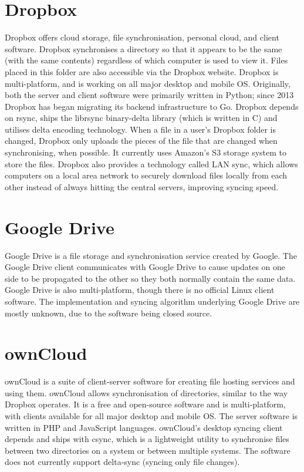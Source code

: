 \section{Dropbox}
  Dropbox offers cloud storage, file synchronisation, personal cloud, and client software. Dropbox synchronises a directory so that it appears to be the same (with the same contents) regardless of which computer is used to view it. Files placed in this folder are also accessible via the Dropbox website. Dropbox is multi-platform, and is working on all major desktop and mobile OS. Originally, both the server and client software were primarily written in Python; since 2013 Dropbox has began migrating its backend infrastructure to Go. Dropbox depends on rsync, ships the librsync binary-delta library (which is written in C) and utilises delta encoding technology. When a file in a user's Dropbox folder is changed, Dropbox only uploads the pieces of the file that are changed when synchronising, when possible. It currently uses Amazon's S3 storage system to store the files. Dropbox also provides a technology called LAN sync, which allows computers on a local area network to securely download files locally from each other instead of always hitting the central servers, improving syncing speed.

\section{Google Drive}
  Google Drive is a file storage and synchronisation service created by Google. The Google Drive client communicates with Google Drive to cause updates on one side to be propagated to the other so they both normally contain the same data. Google Drive is also multi-platform, though there is no official Linux client software. The implementation and syncing algorithm underlying Google Drive are mostly unknown, due to the software being closed source.

\section{ownCloud}
  \label{sec:owncloud}
  ownCloud\cite{owncloud} is a suite of client-server software for creating file hosting services and using them. ownCloud allows synchronisation of directories, similar to the way Dropbox operates. It is a free and open-source software and is multi-platform, with clients available for all major desktop and mobile OS. The server software is written in PHP and JavaScript languages. ownCloud's desktop syncing client depends and ships with csync\cite{csync}, which is a lightweight utility to synchronise files between two directories on a system or between multiple systems. The software does not currently support delta-sync (syncing only file changes).


